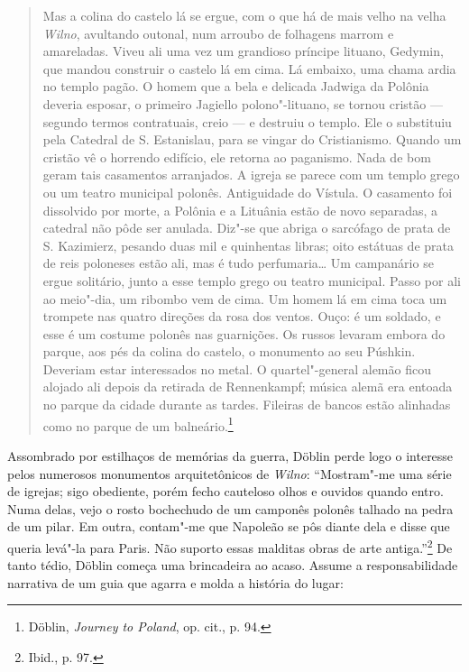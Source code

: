 \begin{quote}
Mas a colina do castelo lá se ergue, com o que há de mais velho na velha
\textit{Wilno}, avultando outonal, num arroubo de folhagens marrom e amareladas.
Viveu ali uma vez um grandioso príncipe lituano, Gedymin, que mandou
construir o castelo lá em cima. Lá embaixo, uma chama ardia no templo
pagão. O homem que a bela e delicada Jadwiga da Polônia deveria esposar,
o primeiro Jagiello polono"-lituano, se tornou cristão --- segundo termos
contratuais, creio --- e destruiu o templo. Ele o substituiu pela Catedral
de S. Estanislau, para se vingar do Cristianismo. Quando um cristão vê o
horrendo edifício, ele retorna ao paganismo. Nada de bom geram tais
casamentos arranjados. A igreja se parece com um templo grego ou um
teatro municipal polonês. Antiguidade do Vístula. O casamento foi
dissolvido por morte, a Polônia e a Lituânia estão de novo separadas, a
catedral não pôde ser anulada. Diz"-se que abriga o sarcófago de prata de
S. Kazimierz, pesando duas mil e quinhentas libras; oito estátuas de
prata de reis poloneses estão ali, mas é tudo perfumaria\ldots{} Um
campanário se ergue solitário, junto a esse templo grego ou teatro
municipal. Passo por ali ao meio"-dia, um ribombo vem de cima. Um homem
lá em cima toca um trompete nas quatro direções da rosa dos ventos.
Ouço: é um soldado, e esse é um costume polonês nas guarnições. Os
russos levaram embora do parque, aos pés da colina do castelo, o
monumento ao seu Púshkin. Deveriam estar interessados no metal. O
quartel"-general alemão ficou alojado ali depois da retirada de
Rennenkampf; música alemã era entoada no parque da cidade durante as
tardes. Fileiras de bancos estão alinhadas como no parque de um
balneário.\footnote{Döblin, \textit{Journey to Poland}, op. cit., p. 94.}
\end{quote}

%

Assombrado por estilhaços de memórias da guerra, Döblin perde logo o
interesse pelos numerosos monumentos arquitetônicos de \textit{Wilno}:
``Mostram"-me uma série de igrejas; sigo obediente, porém fecho cauteloso
olhos e ouvidos quando entro. Numa delas, vejo o rosto bochechudo de um
camponês polonês talhado na pedra de um pilar. Em outra, contam"-me que
Napoleão se pôs diante dela e disse que queria levá"-la para Paris. Não
suporto essas malditas obras de arte antiga.''\footnote{Ibid., p. 97.}
De tanto tédio, Döblin começa uma brincadeira ao acaso. Assume a
responsabilidade narrativa de um guia que agarra e molda a história do
lugar:


